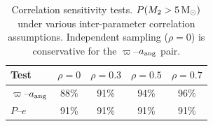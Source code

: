 \documentclass[usenatbib,fleqn]{mnras}
\newcommand{\Msun}{{\rm M}_\odot}
\begin{document}
\begin{table}
\centering
\caption{Correlation sensitivity tests.  $P(M_2 > 5\,\Msun)$
under various inter-parameter correlation assumptions.  Independent
sampling ($\rho = 0$) is conservative for the $\varpi$--$a_{\rm ang}$
pair.}
\label{tab:correlation}
\begin{tabular}{lcccc}
\toprule
Test & $\rho = 0$ & $\rho = 0.3$ & $\rho = 0.5$ & $\rho = 0.7$ \\
\midrule
$\varpi$--$a_{\rm ang}$ & 88\% & 91\% & 94\% & 96\% \\
$P$--$e$               & 91\% & 91\% & 91\% & 91\% \\
\bottomrule
\end{tabular}
\end{table}

\label{lastpage}
\end{document}
